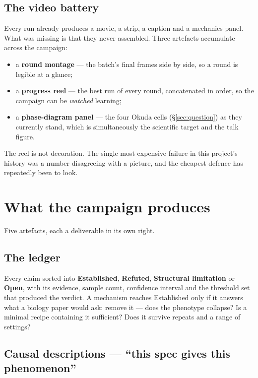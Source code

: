 \documentclass[11pt]{article}
\begin{document}
\subsection{The video battery}

Every run already produces a movie, a strip, a caption and a mechanics panel. What was missing
is that they never assembled. Three artefacts accumulate across the campaign:

\begin{itemize}\itemsep2pt
\item a \textbf{round montage} --- the batch's final frames side by side, so a round is legible
at a glance;
\item a \textbf{progress reel} --- the best run of every round, concatenated in order, so the
campaign can be \emph{watched} learning;
\item a \textbf{phase-diagram panel} --- the four Okuda cells (\S\ref{sec:question}) as they
currently stand, which is simultaneously the scientific target and the talk figure.
\end{itemize}

The reel is not decoration. The single most expensive failure in this project's history was a
number disagreeing with a picture, and the cheapest defence has repeatedly been to look.

\section{What the campaign produces}
\label{sec:out}

Five artefacts, each a deliverable in its own right.

\subsection{The ledger}

Every claim sorted into \textbf{Established}, \textbf{Refuted}, \textbf{Structural limitation} or
\textbf{Open}, with its evidence, sample count, confidence interval and the threshold set that
produced the verdict. A mechanism reaches Established only if it answers what a biology paper
would ask: remove it --- does the phenotype collapse? Is a minimal recipe containing it
sufficient? Does it survive repeats and a range of settings?

\subsection{Causal descriptions --- ``this spec gives this phenomenon''}
\end{document}
